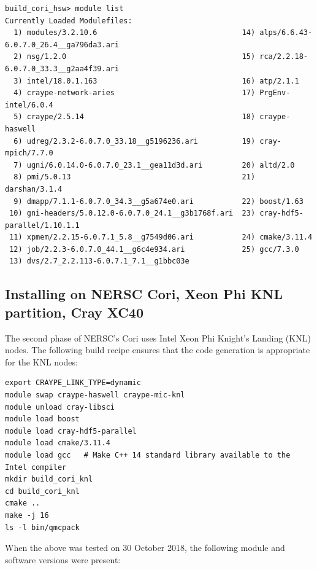 \verbatimfont{\footnotesize}
\begin{verbatim}
build_cori_hsw> module list
Currently Loaded Modulefiles:
  1) modules/3.2.10.6                                 14) alps/6.6.43-6.0.7.0_26.4__ga796da3.ari
  2) nsg/1.2.0                                        15) rca/2.2.18-6.0.7.0_33.3__g2aa4f39.ari
  3) intel/18.0.1.163                                 16) atp/2.1.1
  4) craype-network-aries                             17) PrgEnv-intel/6.0.4
  5) craype/2.5.14                                    18) craype-haswell
  6) udreg/2.3.2-6.0.7.0_33.18__g5196236.ari          19) cray-mpich/7.7.0
  7) ugni/6.0.14.0-6.0.7.0_23.1__gea11d3d.ari         20) altd/2.0
  8) pmi/5.0.13                                       21) darshan/3.1.4
  9) dmapp/7.1.1-6.0.7.0_34.3__g5a674e0.ari           22) boost/1.63
 10) gni-headers/5.0.12.0-6.0.7.0_24.1__g3b1768f.ari  23) cray-hdf5-parallel/1.10.1.1
 11) xpmem/2.2.15-6.0.7.1_5.8__g7549d06.ari           24) cmake/3.11.4
 12) job/2.2.3-6.0.7.0_44.1__g6c4e934.ari             25) gcc/7.3.0
 13) dvs/2.7_2.2.113-6.0.7.1_7.1__g1bbc03e

\end{verbatim}

\subsection{Installing on NERSC Cori, Xeon Phi KNL partition, Cray XC40}
The second phase of NERSC's Cori uses Intel
Xeon Phi Knight's Landing (KNL) nodes. The following build recipe ensures that the code
generation is appropriate for the KNL nodes:

\verbatimfont{\footnotesize}
\begin{verbatim}
export CRAYPE_LINK_TYPE=dynamic
module swap craype-haswell craype-mic-knl
module unload cray-libsci
module load boost
module load cray-hdf5-parallel
module load cmake/3.11.4
module load gcc   # Make C++ 14 standard library available to the Intel compiler
mkdir build_cori_knl
cd build_cori_knl
cmake ..
make -j 16
ls -l bin/qmcpack
\end{verbatim}

When the above was tested on 30 October 2018, the following module and
software versions were present:

